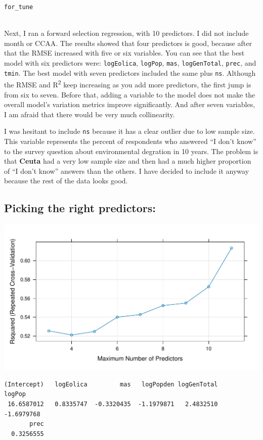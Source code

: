 \documentclass[
]{report}
\begin{document}
\texttt{for\_tune}\strut \\
Next, I ran a forward selection regression, with 10 predictors. I did
not include month or CCAA. The results showed that four predictors is
good, because after that the RMSE increased with five or six variables.
You can see that the best model with six predictors were:
\texttt{logEolica}, \texttt{logPop}, \texttt{mas}, \texttt{logGenTotal},
\texttt{prec}, and \texttt{tmin}. The best model with seven predictors
included the same plus \texttt{ns}. Although the RMSE and
R\textsuperscript{2} keep increasing as you add more predictors, the
first jump is from six to seven. Before that, adding a variable to the
model does not make the overall model's variation metrics improve
significantly. And after seven variables, I am afraid that there would
be very much collinearity.

I was hesitant to include \texttt{ns} because it has a clear outlier due
to low sample size. This variable represents the percent of respondents
who answered ``I don't know'' to the survey question about environmental
degration in 10 years. The problem is that \textbf{Ceuta} had a very low
sample size and then had a much higher proportion of ``I don't know''
answers than the others. I have decided to include it anyway because the
rest of the data looks good.

\hypertarget{picking-the-right-predictors}{%
\subsection{Picking the right
predictors:}\label{picking-the-right-predictors}}

\includegraphics{Modelling_Energy_Intensity-V3_files/figure-pdf/lm-1.pdf}

\begin{verbatim}
(Intercept)   logEolica         mas   logPopden logGenTotal      logPop 
 16.6587012   0.8335747  -0.3320435  -1.1979871   2.4832510  -1.6979768 
       prec 
  0.3256555 
\end{verbatim}
\end{document}
